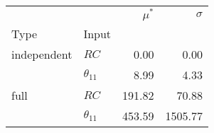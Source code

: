 \begin{tabular}{llrr}
\toprule
     &               &  $\mu^\ast$ &  $\sigma$ \\
Type & Input &             &           \\
\midrule
independent & $RC$ &        0.00 &      0.00 \\
     & $\theta_{11}$ &        8.99 &      4.33 \\
full & $RC$ &      191.82 &     70.88 \\
     & $\theta_{11}$ &      453.59 &   1505.77 \\
\bottomrule
\end{tabular}

